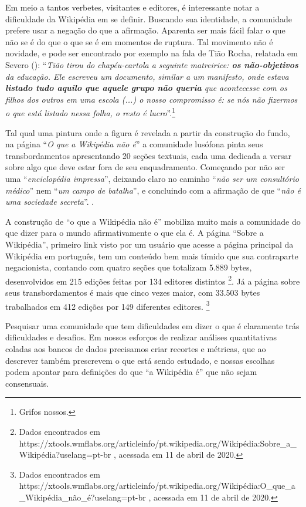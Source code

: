 Em meio a tantos verbetes, visitantes e editores, é interessante notar a dificuldade da Wikipédia em se definir. Buscando sua identidade, a comunidade prefere usar a negação do que a afirmação. Aparenta ser mais fácil falar o que não se é do que o que se é em momentos de ruptura. Tal movimento não é novidade, e pode ser encontrado por exemplo na fala de Tião Rocha, relatada em Severo (\citeyear[p. 19-20]{severo_tics_2016}): ``\textit{Tião tirou do chapéu-cartola a seguinte matreirice: \textbf{os não-objetivos} da educação. Ele escreveu um documento, similar a um manifesto, onde estava \textbf{listado tudo aquilo que aquele grupo não queria} que acontecesse com os filhos dos outros em uma escola (...) o nosso compromisso é: se nós não fizermos o que está listado nessa folha, o resto é lucro}''.\footnote{Grifos nossos.}

Tal qual uma pintura onde a figura é revelada a partir da construção do fundo, na página ``\textit{O que a Wikipédia não é}'' a comunidade lusófona pinta seus transbordamentos apresentando 20 seções textuais, cada uma dedicada a versar sobre algo que deve estar fora de seu enquadramento. Começando por não ser uma ``\textit{enciclopédia impressa}'', deixando claro no caminho ``\textit{não ser um consultório médico}'' nem ``\textit{um campo de batalha}'', e concluindo com a afirmação de que ``\textit{não é uma sociedade secreta}''. .

A construção de ``o que a Wikipédia não é'' mobiliza muito mais a comunidade do que dizer para o mundo afirmativamente o que ela é. A página “Sobre a Wikipédia”, primeiro link visto por um usuário que acesse a página principal da Wikipédia em português, tem um conteúdo bem mais tímido que sua contraparte negacionista,  contando com quatro seções que totalizam 5.889 bytes, desenvolvidos em 215 edições feitas por 134 editores distintos 
\footnote{Dados encontrados em https://xtools.wmflabs.org/articleinfo/pt.wikipedia.org/Wikipédia:Sobre\_a\_Wikipédia?uselang=pt-br , acessada em 11 de abril de 2020.}. Já a página sobre seus transbordamentos é mais que cinco vezes maior, com 33.503 bytes trabalhados em 412 edições por 149 diferentes editores. 
\footnote{Dados encontrados em https://xtools.wmflabs.org/articleinfo/pt.wikipedia.org/Wikipédia:O\_que\_a\_Wikipédia\_não\_é?uselang=pt-br , acessada em 11 de abril de 2020.} 

Pesquisar uma comunidade que tem dificuldades em dizer o que é claramente trás dificuldades e desafios. Em nossos esforços de realizar análises quantitativas coladas aos bancos de dados precisamos criar recortes e métricas, que ao descrever também prescrevem o que está sendo estudado, e nossas escolhas podem apontar para definições do que ``a Wikipédia é'' que não sejam consensuais.

